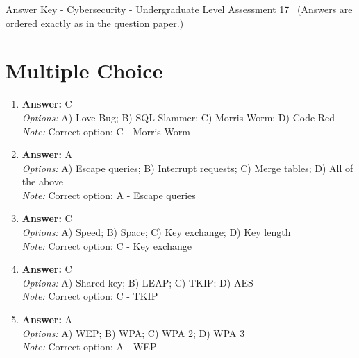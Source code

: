 \documentclass[12pt]{article}
\begin{document}
\begin{center}
Answer Key - Cybersecurity - Undergraduate Level Assessment 17 \
\small (Answers are ordered exactly as in the question paper.)
\end{center}

\section*{Multiple Choice}
\begin{enumerate}[label=\arabic*.]
\item \textbf{Answer:} C
\\ \textit{Options:} A) Love Bug; B) SQL Slammer; C) Morris Worm; D) Code Red
\\ \textit{Note:} Correct option: C - Morris Worm
\item \textbf{Answer:} A
\\ \textit{Options:} A) Escape queries; B) Interrupt requests; C) Merge tables; D) All of the above
\\ \textit{Note:} Correct option: A - Escape queries
\item \textbf{Answer:} C
\\ \textit{Options:} A) Speed; B) Space; C) Key exchange; D) Key length
\\ \textit{Note:} Correct option: C - Key exchange
\item \textbf{Answer:} C
\\ \textit{Options:} A) Shared key; B) LEAP; C) TKIP; D) AES
\\ \textit{Note:} Correct option: C - TKIP
\item \textbf{Answer:} A
\\ \textit{Options:} A) WEP; B) WPA; C) WPA 2; D) WPA 3
\\ \textit{Note:} Correct option: A - WEP
\end{enumerate}
\end{document}
